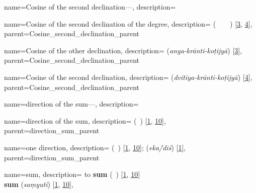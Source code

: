 
{
        name={Cosine of the second declination---},
        description={\phantom{x}\nopagebreak}
}


{
        name={Cosine of the second declination of the degree},
        description={ (\jayb\idafaconsonant\ \tamam\idafaconsonant\ \mayl\idafaconsonant\ \thani\idafavowel\ \daraji) [\hyperlink{PEpass3}{3}, \hyperlink{PEpass4}{4}]},
        parent={Cosine_second_declination_parent}
}        

{
        name={Cosine of the other declination},
        description={ (\textit{anya-krānti-koṭijyā}) [\hyperlink{SEpass3}{3}]},
        parent={Cosine_second_declination_parent}
}
 
{
        name={Cosine of the second declination},
        description={ (\textit{dvitīya-krānti-koṭijyā}) [\hyperlink{SEpass4}{4}]},
        parent={Cosine_second_declination_parent}
}       

{
        name={direction of the sum---},
        description={\phantom{x}\nopagebreak}
}

{
        name={direction of the sum},
        description={  (\jahat\idafaconsonant\ \majmu) [\hyperlink{PEpass1}{1}, \hyperlink{PEpass10}{10}]},
        parent={direction_sum_parent}
}

{
        name={one direction},
        description={  (\yik\ \jahat) [\hyperlink{PEpass1}{1}, \hyperlink{PEpass10}{10}];  (\textit{eka\=/diś})} [\hyperlink{SEpass1}{1}],
        parent={direction_sum_parent} 
}


{
        name={sum},
        description= {\newline to \textbf{sum}\quad  {} (\jam\ \kardan) [\hyperlink{PEpass1}{1}, \hyperlink{PEpass10}{10}]\\[.2\baselineskip]
        \textbf{sum}\quad {} (\textit{saṃyuti}) [\hyperlink{SEpass1}{1}, \hyperlink{SEpass10}{10}]},
}


